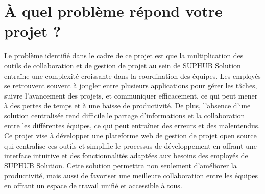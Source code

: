 \section{À quel problème répond votre projet ?}

Le problème identifié dans le cadre de ce projet est que la multiplication des outils de collaboration et de gestion de projet au sein de SUPHUB Solution entraîne une complexité croissante dans la coordination des équipes.
Les employés se retrouvent souvent à jongler entre plusieurs applications pour gérer les tâches, suivre l'avancement des projets, et communiquer efficacement, ce qui peut mener à des pertes de temps et à une baisse de productivité.
De plus, l'absence d'une solution centralisée rend difficile le partage d'informations et la collaboration entre les différentes équipes, ce qui peut entraîner des erreurs et des malentendus.
Ce projet vise à développer une plateforme web de gestion de projet open source qui centralise ces outils
et simplifie le processus de développement en offrant une interface intuitive et des fonctionnalités adaptées aux besoins des employés de SUPHUB Solution.
Cette solution permettra non seulement d'améliorer la productivité, mais aussi de favoriser une meilleure collaboration entre les équipes en offrant un espace de travail unifié et accessible à tous.

